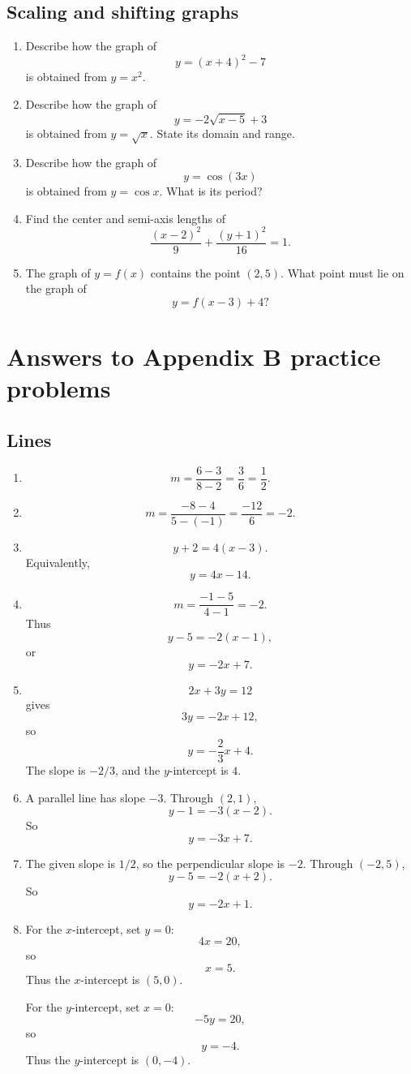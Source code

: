 \subsection*{Scaling and shifting graphs}

\begin{enumerate}
\item Describe how the graph of
\[
y=(x+4)^2-7
\]
is obtained from \(y=x^2\).

\item Describe how the graph of
\[
y=-2\sqrt{x-5}+3
\]
is obtained from \(y=\sqrt{x}\).  State its domain and range.

\item Describe how the graph of
\[
y=\cos(3x)
\]
is obtained from \(y=\cos x\).  What is its period?

\item Find the center and semi-axis lengths of
\[
\frac{(x-2)^2}{9}+\frac{(y+1)^2}{16}=1.
\]

\item The graph of \(y=f(x)\) contains the point \((2,5)\).  What point must lie on
the graph of
\[
y=f(x-3)+4?
\]
\end{enumerate}

\section*{Answers to Appendix B practice problems}
\label{ans:appendix-b-practice}

\subsection*{Lines}

\begin{enumerate}
\item
\[
m=\frac{6-3}{8-2}=\frac36=\frac12.
\]

\item
\[
m=\frac{-8-4}{5-(-1)}=\frac{-12}{6}=-2.
\]

\item
\[
y+2=4(x-3).
\]
Equivalently,
\[
y=4x-14.
\]

\item
\[
m=\frac{-1-5}{4-1}=-2.
\]
Thus
\[
y-5=-2(x-1),
\]
or
\[
y=-2x+7.
\]

\item
\[
2x+3y=12
\]
gives
\[
3y=-2x+12,
\]
so
\[
y=-\frac23x+4.
\]
The slope is \(-2/3\), and the \(y\)-intercept is \(4\).

\item
A parallel line has slope \(-3\).  Through \((2,1)\),
\[
y-1=-3(x-2).
\]
So
\[
y=-3x+7.
\]

\item
The given slope is \(1/2\), so the perpendicular slope is \(-2\).  Through
\((-2,5)\),
\[
y-5=-2(x+2).
\]
So
\[
y=-2x+1.
\]

\item
For the \(x\)-intercept, set \(y=0\):
\[
4x=20,
\]
so
\[
x=5.
\]
Thus the \(x\)-intercept is \((5,0)\).

For the \(y\)-intercept, set \(x=0\):
\[
-5y=20,
\]
so
\[
y=-4.
\]
Thus the \(y\)-intercept is \((0,-4)\).
\end{enumerate}

